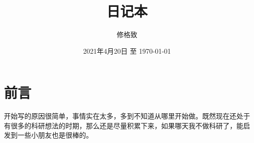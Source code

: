 \documentclass{report}
\title{日记本}
\author{修格致}
\date{2021年4月20日 至 \today}
\begin{document}
\maketitle


\tableofcontents
\newpage

\section{前言}

开始写的原因很简单，事情实在太多，多到不知道从哪里开始做。既然现在还处于有很多的科研想法的时期，那么还是尽量积累下来，如果哪天我不做科研了，能启发到一些小朋友也是很棒的。








\end{document}
